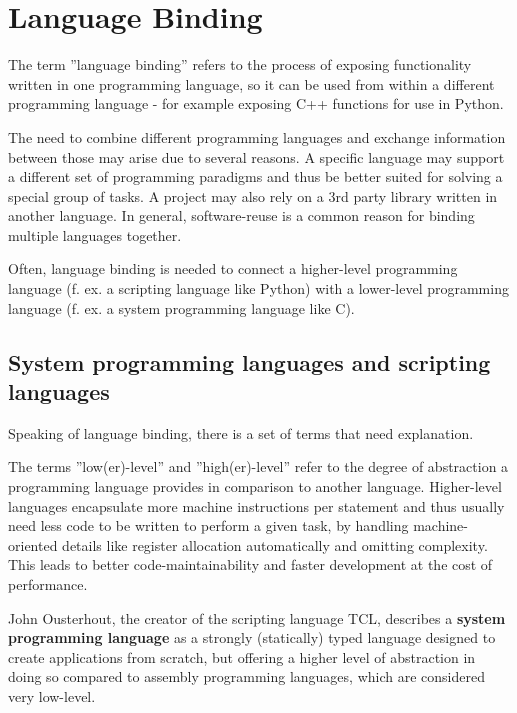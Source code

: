 \chapter{Language Binding}

The term ''language binding'' refers to the process of exposing functionality written in one programming language, so it can be used from within a different programming language - for example exposing C++ functions for use in Python.

The need to combine different programming languages and exchange information between those may arise due to several reasons. A specific language may support a different set of programming paradigms and thus be better suited for solving a special group of tasks. A project may also rely on a 3rd party library written in another language. In general, software-reuse is a common reason for binding multiple languages together.

Often, language binding is needed to connect a higher-level programming language (f. ex. a scripting language like Python) with a lower-level programming language (f. ex. a system programming language like C).

\section{System programming languages and scripting languages}

Speaking of language binding, there is a set of terms that need explanation.

The terms ''low(er)-level'' and ''high(er)-level'' refer to the degree of abstraction a programming language provides in comparison to another language. Higher-level languages encapsulate more machine instructions per statement and thus usually need less code to be written to perform a given task, by handling machine-oriented details like register allocation automatically and omitting complexity. This leads to better code-maintainability and faster development at the cost of performance. 

John Ousterhout, the creator of the scripting language TCL, describes a \textbf{system programming language} as a strongly (statically) typed language designed to create applications from scratch, but offering a higher level of abstraction in doing so compared to assembly programming languages, which are considered very low-level.

